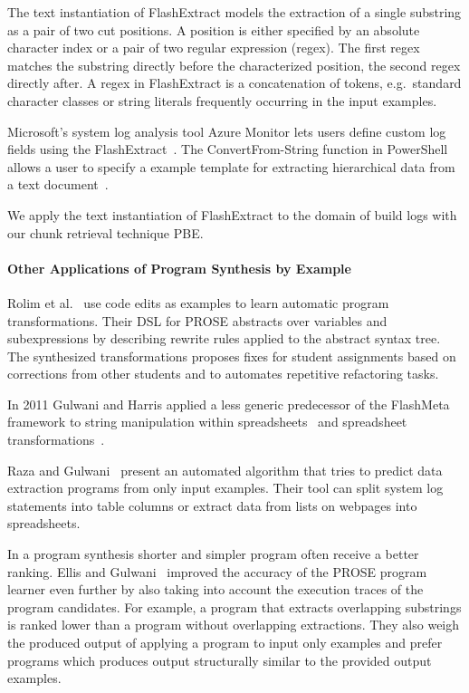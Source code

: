 \documentclass[\myrootdir/main.tex]{subfiles}
\begin{document}
The text instantiation of FlashExtract models the extraction of a single substring as a pair of two cut positions.
A position is either specified by an absolute character index or a pair of two regular expression (regex).
The first regex matches the substring directly before the characterized position, the second regex directly after.
A regex in FlashExtract is a concatenation of tokens, e.g.\ standard character classes or string literals frequently occurring in the input examples.

Microsoft's system log analysis tool Azure Monitor lets users define custom log fields using the FlashExtract~\cite{azure2019custom}.
The ConvertFrom-String function in PowerShell allows a user to specify a example template for extracting hierarchical data from a text document~\cite{powershell2019convert}.

We apply the text instantiation of FlashExtract to the domain of build logs with our chunk retrieval technique PBE\@.

\paragraph{Other Applications of Program Synthesis by Example}
Rolim et al.~\cite{rolim2017learning} use code edits as examples to learn automatic program transformations.
Their DSL for PROSE abstracts over variables and subexpressions by describing rewrite rules applied to the abstract syntax tree.
The synthesized transformations proposes fixes for student assignments based on corrections from other students and to automates repetitive refactoring tasks.

In 2011 Gulwani and Harris applied a less generic predecessor of the FlashMeta framework to string manipulation within spreadsheets~\cite{gulwani2011automating} and spreadsheet transformations~\cite{harris2011spreadsheet}.

Raza and Gulwani~\cite{raza2017automated} present an automated algorithm that tries to predict data extraction programs from only input examples.
Their tool can split system log statements into table columns or extract data from lists on webpages into spreadsheets.

In a program synthesis shorter and simpler program often receive a better ranking.
Ellis and Gulwani~\cite{ellis2017learning} improved the accuracy of the PROSE program learner even further by also taking into account the execution traces of the program candidates.
For example, a program that extracts overlapping substrings is ranked lower than a program without overlapping extractions.
They also weigh the produced output of applying a program to input only examples and prefer programs which produces output structurally similar to the provided output examples.
\end{document}
